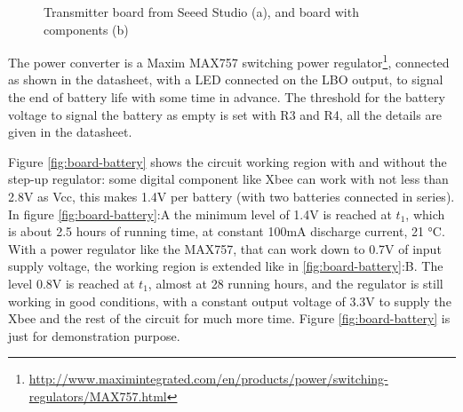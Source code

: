 \documentclass[11pt,english]{article}
\begin{document}
\begin{figure}[htb]%
    \centering
    \qquad
    \caption{Transmitter board from Seeed Studio (a), and board with components (b)}%
    \label{fig:board-trans}%
\end{figure}

The power converter is a Maxim MAX757 switching power regulator\footnote{\url{http://www.maximintegrated.com/en/products/power/switching-regulators/MAX757.html}}, 
connected as shown in the datasheet, with a LED connected on the LBO output, to signal the end of battery life with some 
time in advance. The threshold for the battery voltage to signal the battery as empty is set with R3 and R4, all the details 
are given in the datasheet. 

Figure \ref{fig:board-battery} shows the circuit working region with and without the step-up regulator: some digital component like 
Xbee can work with not less than 2.8V as Vcc, this makes 1.4V per battery (with two batteries connected in series).
In figure \ref{fig:board-battery}:A the minimum level of 1.4V is reached at $t_1$, which is about 2.5 hours of running time, 
at constant 100mA discharge current, 21 °C. With a power regulator like the MAX757, that can work down to 0.7V of input 
supply voltage, the working region is extended like in \ref{fig:board-battery}:B. The level 0.8V is reached at $t_1$, almost 
at 28 running hours, and the regulator is still working in good conditions, with a constant output voltage of 3.3V to supply 
the Xbee and the rest of the circuit for much more time. Figure \ref{fig:board-battery} is just for demonstration purpose.
    
\end{document}
